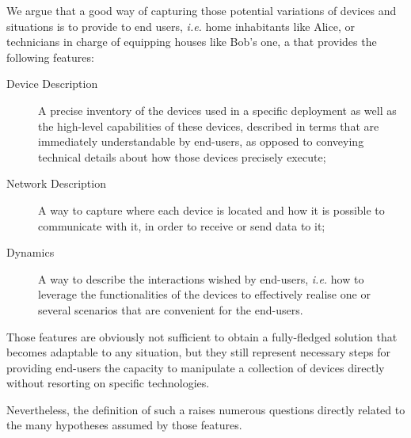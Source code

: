 We argue that a good way of capturing those potential variations of devices and situations is to provide to end users, \textit{i.e.} home inhabitants like Alice, or technicians in charge of equipping houses like Bob's one, a \DSL that provides the following features:

\begin{description}
	\item[Device Description] A precise inventory of the devices used in a specific deployment as well as the high-level capabilities of these devices, described in terms that are immediately understandable by end-users, as opposed to conveying technical details about how those devices precisely execute;
	
	\item[Network Description] A way to capture where each device is located and how it is possible to communicate with it, in order to receive or send data to it;

	\item[Dynamics] A way to describe the interactions wished by end-users, \textit{i.e.} how to leverage the functionalities of the devices to effectively realise one or several scenarios that are convenient for the end-users.  
	
\end{description}
Those features are obviously not sufficient to obtain a fully-fledged solution that becomes adaptable to any situation, but they still represent necessary steps for providing end-users the capacity to manipulate a collection of devices directly without resorting on specific technologies.

Nevertheless, the definition of such a \DSL raises numerous questions directly related to the many hypotheses assumed by those \DSL features.


















